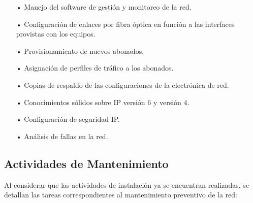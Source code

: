 \begin{itemize}

\item[•]Manejo del software de gestión y monitoreo de la red.

\item[•]Configuración de enlaces por fibra óptica en función a las interfaces provistas con los equipos. 

\item[•]Provisionamiento de nuevos abonados. 

\item[•]Asignación de perfiles de tráfico a los abonados. 

\item[•]Copias de respaldo de las configuraciones de la electrónica de red. 


\item[•]Conocimientos sólidos sobre IP versión 6 y versión 4.


\item[•]Configuración de seguridad IP.

\item[•]Análisis de fallas en la red.


\end{itemize}








\subsection{Actividades de Mantenimiento}
Al considerar que las actividades de instalación ya se encuentran realizadas, se detallan las tareas correspondientes al mantenimiento preventivo de la red:


